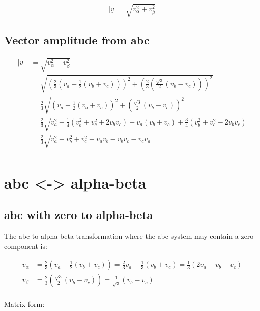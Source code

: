 \documentclass[]{book}
\begin{document}
\[
|\underline{v}| = \sqrt{v_\alpha^2 +  v_\beta^2}
\label{eq:amplAB}
\]

\hypertarget{vector-amplitude-from-abc}{%
\subsection{Vector amplitude from abc}\label{vector-amplitude-from-abc}}

\[
\begin{aligned}
|\underline{v}| &= \sqrt{v_\alpha^2 +  v_\beta^2}  \\
& =  \sqrt{\left(\frac{2}{3}( v_a - \frac{1}{2}  (v_b+v_c)) \right)^2 + \left(\frac{2}{3} (\frac{\sqrt{3}}{2} (v_b-v_c) )\right)^2 }  \\
& = \frac{2}{3} \sqrt{\left( v_a - \frac{1}{2}  (v_b+v_c) \right)^2 + \left( \frac{\sqrt{3}}{2} (v_b-v_c) \right)^2 }  \\
& = \frac{2}{3} \sqrt{ v_a^2 + \frac{1}{4}(v_b^2+v_c^2+2v_b v_c)-v_a(v_b+v_c)  + \frac{3}{4} (v_b^2+v_c^2-2v_bv_c)  } \\
& = \frac{2}{3} \sqrt{ v_a^2 + v_b^2 + v_c^2 -v_a v_b -v_b v_c  -v_c v_a } \\
\end{aligned}
\label{eq:amplAbc}
\]

\hypertarget{abc---alpha-beta}{%
\section{abc \textless{}-\textgreater{} alpha-beta}\label{abc---alpha-beta}}

\hypertarget{abc-with-zero-to-alpha-beta}{%
\subsection{abc with zero to alpha-beta}\label{abc-with-zero-to-alpha-beta}}

The abc to alpha-beta transformation where the abc-system may contain a zero-component is:

\[
\begin{aligned}
v_\alpha &= \frac{2}{3} \left( v_a - \frac{1}{2}  (v_b+v_c) \right) = \frac{2}{3}  v_a - \frac{1}{3}  (v_b+v_c) = \frac{1}{3} ( 2 v_a - v_b-v_c)  \\
v_\beta &= \frac{2}{3} \left( \frac{\sqrt{3}}{2} (v_b-v_c) \right)=  \frac{1}{\sqrt{3}} (v_b-v_c) \\
\end{aligned}
\label{eq:abcAB1}
\]

Matrix form:
\end{document}
